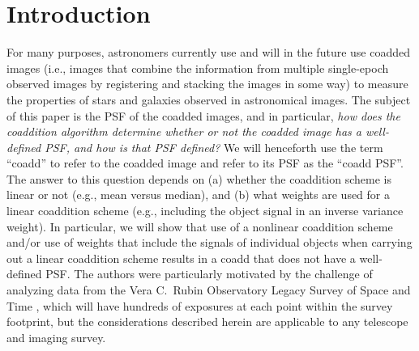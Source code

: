 \documentclass{aastex63}
\newcommand{\irresponse}[1]{{#1}}
\begin{document}
\section{Introduction}\label{sec:intro}

For many purposes, \irresponse{astronomers} currently use and will in \irresponse{the} future use coadded images \irresponse{(i.e., images that combine the information from multiple single-epoch observed images by registering and stacking the images in some way)} to measure the properties of stars and galaxies observed in astronomical images.  The subject of this paper is the PSF of the coadded images, and in particular, {\em \irresponse{how does the coaddition algorithm determine whether or not the coadded image has a well-defined PSF, and how is that PSF defined?}}  We will henceforth use the term ``coadd'' to refer to the coadded image and refer to its PSF as the ``coadd PSF''.  The answer to this question depends on (a) whether the coaddition scheme is linear or not (e.g., mean versus median), and (b) what weights are used for a linear coaddition scheme (e.g., including the object signal in an inverse variance weight). In particular, we will show that use of a nonlinear coaddition scheme and/or use of weights that include the signals of individual objects when carrying out a linear coaddition scheme results in a coadd that does not have a well-defined PSF. \irresponse{The authors were particularly motivated by the challenge of analyzing data from the Vera C.\ Rubin Observatory Legacy Survey of Space and Time \citep[LSST;][]{2009arXiv0912.0201L,2019ApJ...873..111I}, which will have hundreds of exposures at each point within the survey footprint, but the considerations described herein are applicable to any telescope and imaging survey.}
\end{document}
